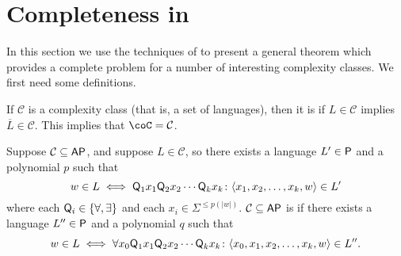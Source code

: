 \section{Completeness in \texorpdfstring{\AP}{AP}}

In this section we use the techniques of \cite[Theorem~8.7]{bcffm} to present a general theorem which provides a complete problem for a number of interesting complexity classes.
We first need some definitions.

If $\mathcal{C}$ is a complexity class (that is, a set of languages), then it is  if $L\in\mathcal{C}$ implies $\overline{L}\in\mathcal{C}$.
This implies that $\coC=\mathcal{C}$.

Suppose $\mathcal{C}\subseteq\AP$, and suppose $L\in\mathcal{C}$, so there exists a language $L'\in\P$ and a polynomial $p$ such that
\begin{displaymath}
  w\in L \iff \Q_1x_1\Q_2x_2\cdots \Q_kx_k\colon \langle x_1, x_2, \ldots, x_k, w\rangle\in L'
\end{displaymath}
where each $\Q_i\in\{\forall, \exists\}$ and each $x_i\in\Sigma^{\leq p(|w|)}$.
$\mathcal{C}\subseteq\AP$ is  if there exists a language $L''\in\P$ and a polynomial $q$ such that
\begin{displaymath}
  w\in L \iff \forall x_0 \Q_1x_1\Q_2x_2\cdots \Q_kx_k\colon \langle x_0, x_1, x_2, \ldots, x_k, w \rangle\in L''.
\end{displaymath}

